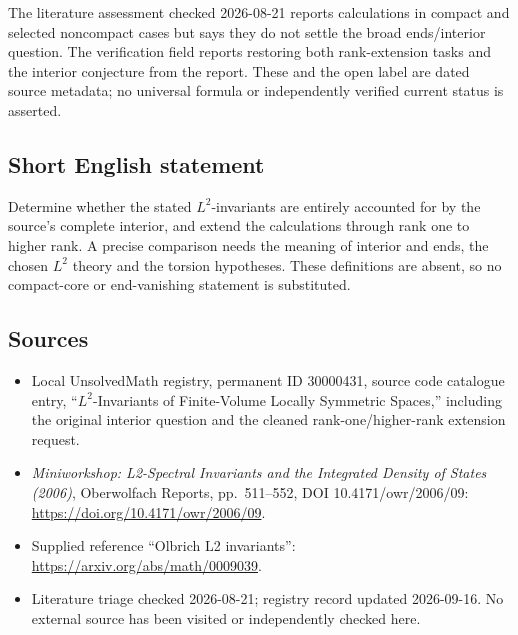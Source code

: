 \documentclass[11pt]{article}
\begin{document}
The literature assessment checked 2026-08-21 reports calculations in compact and selected noncompact cases but says they do not settle the broad ends/interior question. The verification field reports restoring both rank-extension tasks and the interior conjecture from the report. These and the open label are dated source metadata; no universal formula or independently verified current status is asserted.
\subsection{Short English statement}
Determine whether the stated \(L^2\)-invariants are entirely accounted for by the source's complete interior, and extend the calculations through rank one to higher rank. A precise comparison needs the meaning of interior and ends, the chosen \(L^2\) theory and the torsion hypotheses. These definitions are absent, so no compact-core or end-vanishing statement is substituted.
\subsection{Sources}
\begin{itemize}
\item Local UnsolvedMath registry, permanent ID 30000431, source code catalogue entry, ``\(L^2\)-Invariants of Finite-Volume Locally Symmetric Spaces,'' including the original interior question and the cleaned rank-one/higher-rank extension request.
\item \emph{Miniworkshop: L2-Spectral Invariants and the Integrated Density of States (2006)}, Oberwolfach Reports, pp.\ 511--552, DOI 10.4171/owr/2006/09: \url{https://doi.org/10.4171/owr/2006/09}.
\item Supplied reference ``Olbrich L2 invariants'': \url{https://arxiv.org/abs/math/0009039}.
\item Literature triage checked 2026-08-21; registry record updated 2026-09-16. No external source has been visited or independently checked here.
\end{itemize}
\end{document}
